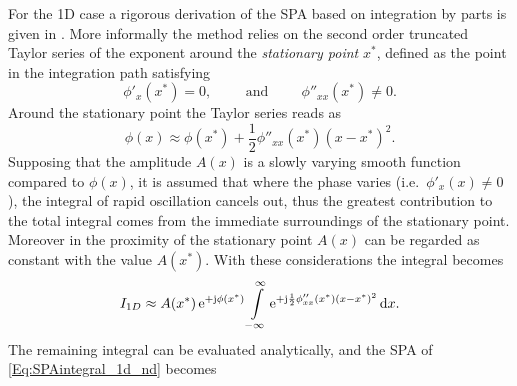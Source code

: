 For the 1D case a rigorous derivation of the SPA based on integration by parts is given in \cite{Blenstein1975, Bleistein1984, Williams1999}.
More informally the method relies on the second order truncated Taylor series of the exponent around the \emph{stationary point} $x^*$, defined as the point in the integration path satisfying 
\begin{equation}
\phi'_x(x^*) = 0, \hspace{1cm} \text{and} \hspace{1cm} \phi''_{xx}(x^*) \neq 0.
\end{equation}
Around the stationary point the Taylor series reads as
\begin{equation}
\phi(x) \approx \phi(x^*) + \frac{1}{2}\phi''_{xx}(x^*)(x-x^*)^2.
\end{equation}
%
Supposing that the amplitude $A(x)$ is a slowly varying smooth function compared to $\phi(x)$, it is assumed that where the phase varies (i.e.\ $\phi'_x(x) \neq 0$), the integral of rapid oscillation cancels out, thus the greatest contribution to the total integral comes from the immediate surroundings of the stationary point.
Moreover in the proximity of the stationary point $A(x)$ can be regarded as constant with the value $A(x^*)$.
%
With these considerations the integral becomes
\begin{align}
I_{1D} \approx A(x^*)\,\mathrm{e}^{+\mathrm{j}\phi(x^*)} 
\int\limits_{-\infty}^{\infty} \mathrm{e}^{+\mathrm{j} \frac{1}{2}\phi''_{xx}(x^*)(x-x^*)^2} \, \mathrm{d} x.
\end{align}
The remaining integral can be evaluated analytically, and the SPA of \eqref{Eq:SPAintegral_1d_nd} becomes \cite[Ch.\ 2.8]{Blenstein1975}

